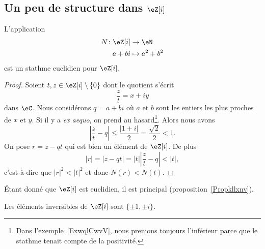 \subsection{Un peu de structure dans \texorpdfstring{\(  \eZ[i]\)}{Zi}}

\begin{lemma}   \label{LemSCAlICY}
	L'application
	\begin{equation}
		\begin{aligned}
			N\colon \eZ[i] & \to \eN         \\
			a+bi           & \mapsto a^2+b^2
		\end{aligned}
	\end{equation}
	est un stathme euclidien pour \( \eZ[i]\).
\end{lemma}

\begin{proof}
	Soient \( t,z\in \eZ[i]\setminus\{ 0 \}\) dont le quotient s'écrit
	\begin{equation}
		\frac{ z }{ t }=x+iy
	\end{equation}
	dans \( \eC\). Nous considérons \( q=a+bi\) où \( a\) et \( b\) sont les entiers les plus proches de \( x\) et \( y\). Si il y a \emph{ex aequo}, on prend au hasard\footnote{Dans l'exemple~\ref{ExwqlCwvV}, nous prenions toujours l'inférieur parce que le stathme tenait compte de la positivité.}. Alors nous avons
	\begin{equation}
		| \frac{ z }{ t }-q |\leq \frac{ | 1+i | }{ 2 }=\frac{ \sqrt{2} }{2}<1.
	\end{equation}
	On pose \( r=z-qt\) qui est bien un élément de \( \eZ[i]\). De plus
	\begin{equation}
		| r |=| z-qt |=| t | |\frac{ z }{ t }-q |<| t |,
	\end{equation}
	c'est-à-dire que \( | r |^2<| t |^2\) et donc \( N(r)<N(t)\).
\end{proof}
Étant donné que \( \eZ[i]\) est euclidien, il est principal (proposition~\ref{Propkllxnv}).

\begin{lemma}   \label{LemBMEIiiV}
	Les éléments inversibles de \( \eZ[i]\) sont \( \{ \pm 1,\pm i \}\).
\end{lemma}

